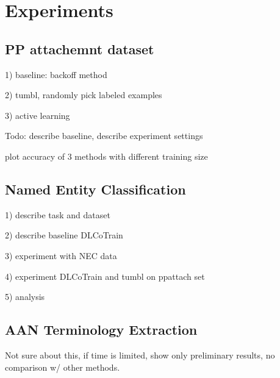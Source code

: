 \section{Experiments} 

\subsection{PP attachemnt dataset}


1) baseline: backoff method

2) tumbl, randomly pick labeled examples

3) active learning

Todo: describe baseline, describe experiment settings

plot accuracy of 3 methods with different training size


\subsection{Named Entity Classification}

1) describe task and dataset

2) describe baseline DLCoTrain

3) experiment with NEC data

4) experiment DLCoTrain and tumbl on ppattach set

5) analysis


\subsection{AAN Terminology Extraction}

Not sure about this, if time is limited, show only preliminary
results, no comparison w/ other methods.
